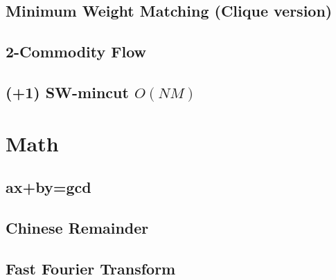 \documentclass[10pt,twocolumn,oneside]{article}
\begin{document}
\subsection{Minimum Weight Matching (Clique version)}


%


\subsection{2-Commodity Flow}


%

\subsection{(+1) SW-mincut $O(NM)$}


\newpage

\section{Math}
\subsection{ax+by=gcd}


\subsection{Chinese Remainder}


\newpage

\subsection{Fast Fourier Transform}

\end{document}
